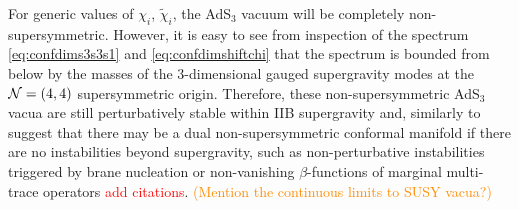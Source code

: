 \documentclass[a4paper, 11pt]{article}
\numberwithin{equation}{section}
\newcommand{\ts}[1]{\widetilde{#1}}
\newcommand{\+}{\oplus}
\newcommand{\EM}[1]{\textcolor{red}{#1}}
\newcommand{\CE}[1]{\textcolor{darkorange}{#1}}
\begin{document}
For generic values of $\chi_i$, $\ts{\chi}_i$, the AdS$_3$ vacuum will be completely non-supersymmetric. However, it is easy to see from inspection of the spectrum \eqref{eq:confdims3s3s1} and \eqref{eq:confdimshiftchi} that the spectrum is bounded from below by the masses of the 3-dimensional gauged supergravity modes at the ${\cal N}=(4,4)$ supersymmetric origin. Therefore, these non-supersymmetric AdS$_3$ vacua are still perturbatively stable within IIB supergravity and, similarly to \cite{Giambrone:2021wsm} suggest that there may be a dual non-supersymmetric conformal manifold if there are no instabilities beyond supergravity, such as non-perturbative instabilities triggered by brane nucleation or non-vanishing $\beta$-functions of marginal multi-trace operators \EM{add citations}. \CE{(Mention the continuous limits to SUSY vacua?)}
\end{document}
